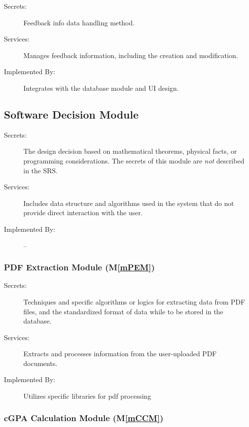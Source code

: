 \documentclass[12pt, titlepage]{article}
\newcommand{\mref}[1]{M\ref{#1}}
\begin{document}
\begin{description}
\item[Secrets:] Feedback info data handling method.
\item[Services:] Manages feedback information, including the creation and modification.
\item[Implemented By:] Integrates with the database module and UI design.
\end{description}

\subsection{Software Decision Module}

\begin{description}
\item[Secrets:] The design decision based on mathematical theorems, physical
  facts, or programming considerations. The secrets of this module are
  \emph{not} described in the SRS.
\item[Services:] Includes data structure and algorithms used in the system that
  do not provide direct interaction with the user. 
\item[Implemented By:] --
\end{description}


\subsubsection{PDF Extraction Module (\mref{mPEM})}

\begin{description}
\item[Secrets:] Techniques and specific algorithms or logics for extracting data from PDF files, and the standardized format of data while to be stored in the database. 
\item[Services:] Extracts and processes information from the user-uploaded PDF documents.
\item[Implemented By:] Utilizes specific libraries for pdf processing
\end{description}

\subsubsection{cGPA Calculation Module (\mref{mCCM})}
\end{document}
